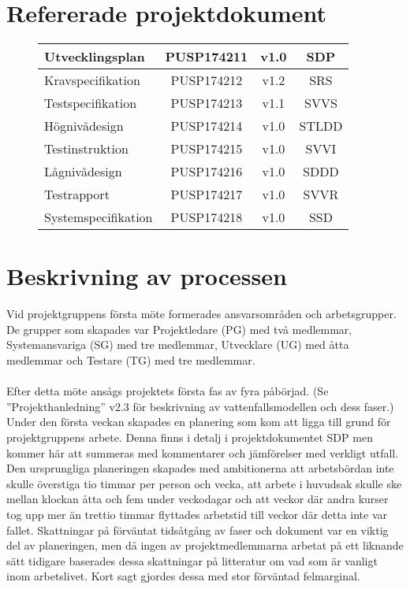 \documentclass[paper=a4, fontsize=11pt,twoside]{article}
\begin{document}
\section{Refererade projektdokument}
\begin{figure}[h!]
\centering
\begin{tabular}{|l|c|c|c|}
\hline
Utvecklingsplan & PUSP174211 & v1.0 & SDP\\
\hline
Kravspecifikation & PUSP174212 & v1.2 & SRS\\
\hline
Testspecifikation & PUSP174213 & v1.1 & SVVS\\
\hline 
Högnivådesign & PUSP174214 & v1.0 & STLDD\\ 
\hline
Testinstruktion & PUSP174215 & v1.0 & SVVI\\
\hline
Lågnivådesign & PUSP174216 & v1.0 & SDDD\\
\hline
Testrapport & PUSP174217 & v1.0 & SVVR\\
\hline
Systemspecifikation & PUSP174218 & v1.0 & SSD\\
\hline
\end{tabular}
\end{figure}

\section{Beskrivning av processen}
Vid projektgruppens första möte formerades ansvarsområden och arbetsgrupper. 
De grupper som skapades var Projektledare (PG) med två medlemmar, Systemansvariga (SG) 
med tre medlemmar, Utvecklare (UG) med åtta medlemmar och Testare (TG) med tre
medlemmar.\\
\\
Efter detta möte ansågs projektets första fas av fyra påbörjad. 
(Se ”Projekthanledning” v2.3 för beskrivning av vattenfallsmodellen och dess faser.)
Under den första veckan skapades en planering som kom att ligga till grund för 
projektgruppens arbete. Denna finns i detalj i projektdokumentet SDP men kommer här att 
summeras med kommentarer och jämförelser med verkligt utfall.
Den ursprungliga planeringen skapades med ambitionerna att arbetsbördan inte skulle 
överstiga tio timmar per person och vecka, att arbete i huvudsak skulle ske mellan klockan 
åtta och fem under veckodagar och att veckor där andra kurser tog upp mer än trettio 
timmar flyttades arbetstid till veckor där detta inte var fallet.
Skattningar på förväntat tidsåtgång av faser och dokument var en viktig del av 
planeringen, men då ingen av projektmedlemmarna arbetat på ett liknande sätt tidigare 
baserades dessa skattningar på litteratur om vad som är vanligt inom arbetslivet. Kort 
sagt gjordes dessa med stor förväntad felmarginal.
\end{document}
